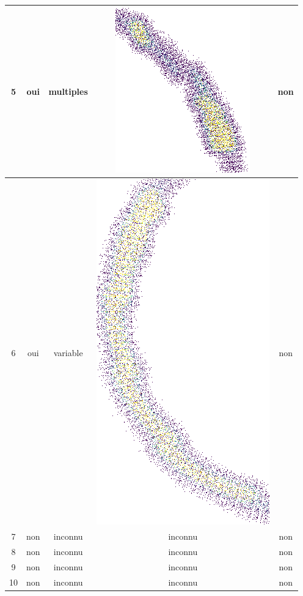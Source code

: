 \begin{table}[h]
\begin{tabular}{|c|c|c|c|c|}
\hline
5 & oui & multiples & \includegraphics[scale=0.2]{images/set27.png}  & non \\
\hline
6 & oui & variable & \includegraphics[scale=0.1]{images/set28.png}  & non \\
\hline
7 & non & inconnu & inconnu & non \\
\hline
8 & non & inconnu & inconnu & non \\
\hline
9 & non & inconnu & inconnu & non \\
\hline
10 & non & inconnu & inconnu  & non \\

\end{tabular}
\end{table}
